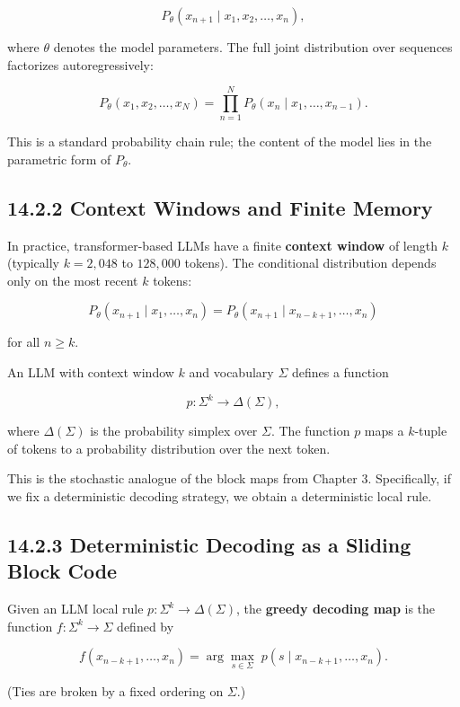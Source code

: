 \[
P_\theta(x_{n+1} \mid x_1, x_2, \ldots, x_n),
\]

where $\theta$ denotes the model parameters. The full joint distribution over sequences factorizes autoregressively:

\[
P_\theta(x_1, x_2, \ldots, x_N) = \prod_{n=1}^{N} P_\theta(x_n \mid x_1, \ldots, x_{n-1}).
\]

This is a standard probability chain rule; the content of the model lies in the parametric form of $P_\theta$.

\subsection{14.2.2 Context Windows and Finite Memory}

In practice, transformer-based LLMs have a finite \textbf{context window} of length $k$ (typically $k = 2{,}048$ to $128{,}000$ tokens). The conditional distribution depends only on the most recent $k$ tokens:

\[
P_\theta(x_{n+1} \mid x_1, \ldots, x_n) = P_\theta(x_{n+1} \mid x_{n-k+1}, \ldots, x_n)
\]

for all $n \geq k$.

\begin{definition}
An LLM with context window $k$ and vocabulary $\Sigma$ defines a function

\[
p: \Sigma^k \to \Delta(\Sigma),
\]

where $\Delta(\Sigma)$ is the probability simplex over $\Sigma$. The function $p$ maps a $k$-tuple of tokens to a probability distribution over the next token.

This is the stochastic analogue of the block maps from Chapter 3. Specifically, if we fix a deterministic decoding strategy, we obtain a deterministic local rule.
\end{definition}

\subsection{14.2.3 Deterministic Decoding as a Sliding Block Code}

\begin{definition}
Given an LLM local rule $p: \Sigma^k \to \Delta(\Sigma)$, the \textbf{greedy decoding map} is the function $f: \Sigma^k \to \Sigma$ defined by

\[
f(x_{n-k+1}, \ldots, x_n) = \arg\max_{s \in \Sigma} \; p(s \mid x_{n-k+1}, \ldots, x_n).
\]

(Ties are broken by a fixed ordering on $\Sigma$.)
\end{definition}

